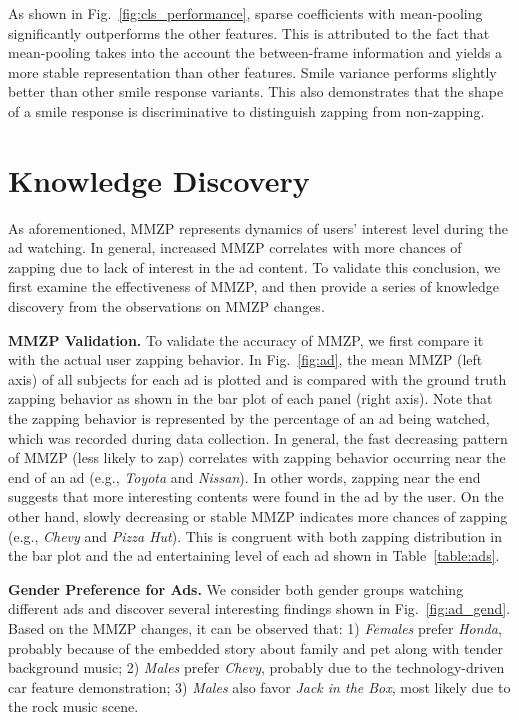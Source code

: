 \documentclass[10pt,journal,cspaper,compsoc]{IEEEtran}
\begin{document}
As shown in Fig.~\ref{fig:cls_performance}, sparse coefficients with mean-pooling significantly outperforms the other features. This is attributed to the fact that mean-pooling takes into the account the between-frame information and yields a more stable representation than other features. Smile variance performs slightly better than other smile response variants. This also demonstrates that the shape of a smile response is discriminative to distinguish zapping from non-zapping. 



\section{Knowledge Discovery}

As aforementioned, MMZP represents dynamics of users' interest level during the ad watching. In general, increased MMZP correlates with more chances of zapping due to lack of interest in the ad content. To validate this conclusion, we first examine the effectiveness of MMZP, and then provide a series of knowledge discovery from the observations on MMZP changes. 

\noindent \textbf{MMZP Validation.} To validate the accuracy of MMZP, we first compare it with the actual user zapping behavior. In Fig.~\ref{fig:ad}, the mean MMZP (left axis) of all subjects for each ad is plotted and is compared with the ground truth zapping behavior as shown in the bar plot of each panel (right axis). Note that the zapping behavior is represented by the percentage of an ad being watched, which was recorded during data collection. In general, the fast decreasing pattern of MMZP (less likely to zap) correlates with zapping behavior occurring near the end of an ad (e.g., \textit{Toyota} and \textit{Nissan}). In other words, zapping near the end suggests that more interesting contents were found in the ad by the user. On the other hand, slowly decreasing or stable MMZP indicates more chances of zapping (e.g., \textit{Chevy} and \textit{Pizza Hut}). This is congruent with both zapping distribution in the bar plot and the ad entertaining level of each ad shown in Table~\ref{table:ads}. 

\noindent \textbf{Gender Preference for Ads.} We consider both gender groups watching different ads and discover several interesting findings shown in Fig.~\ref{fig:ad_gend}. Based on the MMZP changes, it can be observed that: 1) \textit{Females} prefer \textit{Honda}, probably because of the embedded story about family and pet along with tender background music; 2) \textit{Males} prefer \textit{Chevy}, probably due to the technology-driven car feature demonstration; 3) \textit{Males} also favor \textit{Jack in the Box}, most likely due to the rock music scene. 
\end{document}
